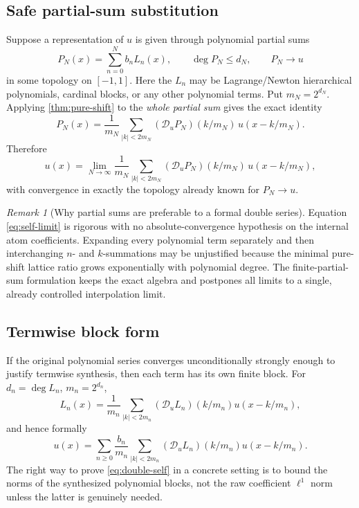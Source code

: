 \documentclass[11pt,oneside]{article}
\numberwithin{equation}{section}
\theoremstyle{definition}
\theoremstyle{remark}
\newtheorem{remark}[theorem]{Remark}
\newcommand{\calD}{\mathscr D_u}
\begin{document}
\subsection{Safe partial-sum substitution}
Suppose a representation of \(u\) is given through polynomial partial sums
\begin{equation}
 P_N(x)=\sum_{n=0}^{N}b_nL_n(x),
 \qquad
 \deg P_N\le d_N,
 \qquad
 P_N\longrightarrow u
 \label{eq:poly-series}
\end{equation}
in some topology on \([-1,1]\).  Here the \(L_n\) may be Lagrange/Newton
hierarchical polynomials, cardinal blocks, or any other polynomial terms.  Put
\(m_N=2^{d_N}\).  Applying \cref{thm:pure-shift} to the \emph{whole partial sum}
gives the exact identity
\begin{equation}
 \boxed{
 P_N(x)=\frac1{m_N}\sum_{|k|<2m_N}
 (\calD P_N)(k/m_N)\,u(x-k/m_N).}
 \label{eq:series-partial}
\end{equation}
Therefore
\begin{equation}
 \boxed{
 u(x)=\lim_{N\to\infty}\frac1{m_N}\sum_{|k|<2m_N}
 (\calD P_N)(k/m_N)\,u(x-k/m_N),}
 \label{eq:self-limit}
\end{equation}
with convergence in exactly the topology already known for \(P_N\to u\).

\begin{remark}[Why partial sums are preferable to a formal double series]
Equation \eqref{eq:self-limit} is rigorous with no absolute-convergence hypothesis
on the internal atom coefficients.  Expanding every polynomial term separately and
then interchanging \(n\)- and \(k\)-summations may be unjustified because the
minimal pure-shift lattice ratio grows exponentially with polynomial degree.  The
finite-partial-sum formulation keeps the exact algebra and postpones all limits to a
single, already controlled interpolation limit.
\end{remark}

\subsection{Termwise block form}
If the original polynomial series converges unconditionally strongly enough to
justify termwise synthesis, then each term has its own finite block.  For
\(d_n=\deg L_n\), \(m_n=2^{d_n}\),
\begin{equation}
 L_n(x)=\frac1{m_n}\sum_{|k|<2m_n}
 (\calD L_n)(k/m_n)u(x-k/m_n),
 \label{eq:term-block}
\end{equation}
and hence formally
\begin{equation}
 u(x)=\sum_{n\ge0}\frac{b_n}{m_n}
 \sum_{|k|<2m_n}(\calD L_n)(k/m_n)u(x-k/m_n).
 \label{eq:double-self}
\end{equation}
The right way to prove \eqref{eq:double-self} in a concrete setting is to bound the
norms of the synthesized polynomial blocks, not the raw coefficient \(\ell^1\)
norm unless the latter is genuinely needed.
\end{document}
